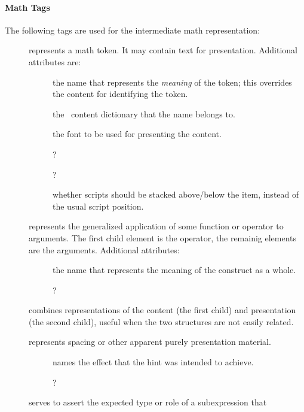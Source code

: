 \documentclass{book}
\begin{document}
\paragraph{Math Tags} The following tags are used for the intermediate math representation:
\begin{description}
\item[] represents a math token. It may contain text for presentation.
   Additional attributes are:
  \begin{description}
   \item[] the name that represents the \emph{meaning} of the token; this overrides
      the content for identifying the token.
   \item[] the \OpenMath\ content dictionary that the name belongs to.
   \item[] the font to be used for presenting the content.
   \item[] ?
   \item[] ?
   \item[] whether scripts should be stacked above/below the item, instead
     of the usual script position.
  \end{description}
\item[] represents the generalized application of some function or operator to arguments.
   The first child element is the operator, the remainig elements are the arguments.
   Additional attributes:
  \begin{description}
    \item[] the name that represents the meaning of the construct as a whole.
    \item[] ?
  \end{description}
\item[] combines representations of the content (the first child) and presentation
   (the second child), useful when the two structures are not easily related.
\item[] represents spacing or other apparent purely presentation material.
  \begin{description}
    \item[] names the effect that the hint was intended to achieve.
    \item[] ?
  \end{description}
\item[] serves to assert the expected type or role of a subexpression that

\end{description}
\end{document}
